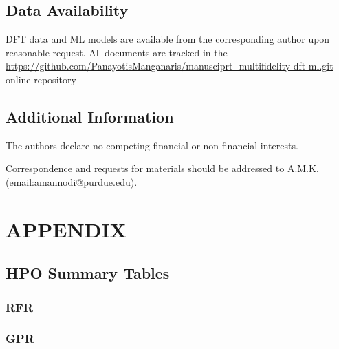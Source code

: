 \documentclass[aip, jmp, amsmath, amssymb]{revtex4-2}
\begin{document}
\subsection*{Data Availability}
\label{sec:org13fcbf0}
DFT data and ML models are available from the corresponding author
upon reasonable request. All documents are tracked in the
\url{https://github.com/PanayotisManganaris/manusciprt--multifidelity-dft-ml.git}
online repository

\subsection*{Additional Information}
\label{sec:orga773352}
The authors declare no competing financial or non-financial interests.

Correspondence and requests for materials should be addressed to A.M.K.
(email:amannodi@purdue.edu).

\section*{}
\label{sec:org872d683}



\section*{APPENDIX}
\label{sec:orga73ae8a}
\subsection*{HPO Summary Tables}
\label{sec:org98352a9}
\subsubsection*{RFR}
\label{sec:orgf86384d}
\subsubsection*{GPR}
\label{sec:org37fef4c}
\end{document}
